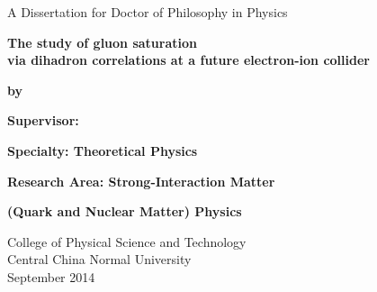 \mbox{}\vskip 0.8cm
\begin{center}
{\Large A Dissertation for Doctor of Philosophy in Physics}
\end{center}
\vspace{0.22in}
\begin{center} {\LARGE \textbf{The study of gluon saturation \\ via dihadron correlations at a future electron-ion collider}}
\end{center}
\vspace{0.22in}

\begin{center}
\bfseries{
{\Large  by \\   \vskip 0.22in  \vskip 0.4in }
}
\end{center}




\mbox{}\hskip 0.3cm{\Large { \bfseries Supervisor:  %
} }

\mbox{}\hskip 0.3cm{\Large { \bfseries Specialty:  Theoretical Physics} }

\mbox{}\hskip 0.3cm{\Large { \bfseries Research Area: Strong-Interaction Matter } }

\mbox{}\hskip 0.3cm{\Large { \bfseries (Quark and Nuclear Matter) Physics} }

\vskip 1.55in


\begin{center}
{\Large
College of Physical Science and Technology \\
Central \hskip 0.2cm China \hskip 0.2cm Normal \hskip 0.2cm University \\ 
\vskip 0.22cm September \hskip 0.2cm 2014 }
\end{center}

\clearpage
